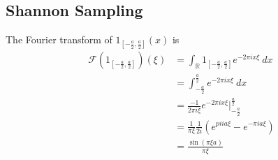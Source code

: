 \documentclass[a4paper]{article}
\begin{document}
\subsection{Shannon Sampling}
The Fourier transform of $1_{[-\frac{a}{2}, \frac{a}{2}]}(x)$ is
\begin{align}
    \mathcal{F}\left(1_{[-\frac{a}{2}, \frac{a}{2}]}\right)(\xi)
    &= \int_\mathbb{R} 1_{[-\frac{a}{2}, \frac{a}{2}]} e^{-2\pi i x \xi}\
    dx\\
    &= \int_{-\frac{a}{2}}^{\frac{a}{2}} e^{-2\pi i x\xi}\ dx\\
    &= \frac{-1}{2\pi i \xi} e^{-2\pi i x
        \xi}\bigg|_{-\frac{a}{2}}^{\frac{a}{2}}\\
    &= \frac{1}{\pi \xi} \frac{1}{2i}\left(
        e^{pi i a \xi} - e^{-\pi i a \xi}
    \right)\\
    &= \frac{\sin(\pi \xi a)}{\pi \xi}
\end{align}

\end{document}

